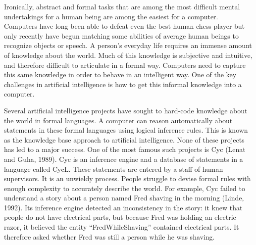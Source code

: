 \documentclass[11pt]{article}
\begin{document}
Ironically, abstract and formal tasks that are among the most diﬃcult mental undertakings for a human being are among the easiest for a computer.
Computers have long been able to defeat even the best human chess player but only recently have begun matching some abilities of average human beings to recognize objects or speech.
A person’s everyday life requires an immense amount of knowledge about the world.
Much of this knowledge is subjective and intuitive, and therefore diﬃcult to articulate in a formal way.
Computers need to capture this same knowledge in order to behave in an intelligent way.
One of the key challenges in artificial intelligence is how to get this informal knowledge into a computer.

Several artiﬁcial intelligence projects have sought to hard-code knowledge about the world in formal languages.
A computer can reason automatically about statements in these formal languages using logical inference rules.
This is known as the knowledge base approach to artificial intelligence.
None of these projects has led to a major success.
One of the most famous such projects is Cyc (Lenat and Guha, 1989).
Cyc is an inference engine and a database of statements in a language called CycL.
These statements are entered by a staff of human supervisors.
It is an unwieldy process.
People struggle to devise formal rules with enough complexity to accurately describe the world.
For example, Cyc failed to understand a story about a person named Fred shaving in the morning (Linde, 1992).
Its inference engine detected an inconsistency in the story: it knew that people do not have electrical parts, but because Fred was holding an electric razor, it believed the entity “FredWhileShaving” contained electrical parts.
It therefore asked whether Fred was still a person while he was shaving.
\end{document}

